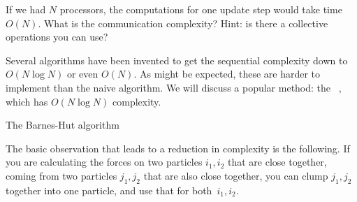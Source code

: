 \begin{exercise}
  If we had $N$ processors, the computations for one update step would
  take time~$O(N)$.  What is the communication complexity? Hint: is
  there a collective operations you can use?
\end{exercise}

Several algorithms have been invented to get the sequential complexity
down to $O(N\log N)$ or even $O(N)$. As might be expected, these are
harder to implement than the naive algorithm. We will discuss a
popular method: the ~\cite{BarnesHut},
which has $O(N\log N)$ complexity.

 {The Barnes-Hut algorithm}

The basic observation that leads to a reduction in complexity is the
following. If you are calculating the forces on two particles
$i_1,i_2$ that are close together, coming from two particles $j_1,j_2$
that are also close together, you can clump $j_1,j_2$ together into
one particle, and use that for both~$i_1,i_2$.

